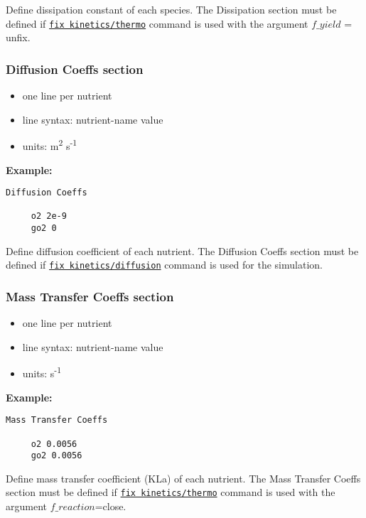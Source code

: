 \documentclass[11pt,a4paper,openright]{article}
\begin{document}
Define dissipation constant of each species. 
The Dissipation section must be defined if 
\hyperref[fkineticsthermo]{\tt fix kinetics/thermo} 
command is used with the argument $f\_yield$ = unfix. 

\newpage
\subsubsection{Diffusion Coeffs section}
\label{sdiffusion}
\begin{itemize} [nosep]
    \item one line per nutrient
    \item line syntax: nutrient-name {} value 
    \item units: m\textsuperscript{2} s\textsuperscript{-1} \\  
    
\end{itemize} 

\textbf{Example:}
\begin{Verbatim}[frame=single]
 Diffusion Coeffs

     o2 2e-9
     go2 0

\end{Verbatim}

Define diffusion coefficient of each nutrient. 
The Diffusion Coeffs section must be defined if 
\hyperref[fkineticsdiffusion]{\tt fix kinetics/diffusion} 
command is used for the simulation. 


\subsubsection{Mass Transfer Coeffs section}
\label{skla}
\begin{itemize} [nosep]
    \item one line per nutrient
    \item line syntax: nutrient-name {} value 
    \item units: s\textsuperscript{-1} \\  
    
\end{itemize} 

\textbf{Example:}
\begin{Verbatim}[frame=single]
 Mass Transfer Coeffs

     o2 0.0056
     go2 0.0056

\end{Verbatim}

Define mass transfer coefficient (KLa) of each nutrient. 
The Mass Transfer Coeffs section must be defined if 
\hyperref[fkineticsthermo]{\tt fix kinetics/thermo}
command is used with the argument $f\_reaction$=close. 
\end{document}
